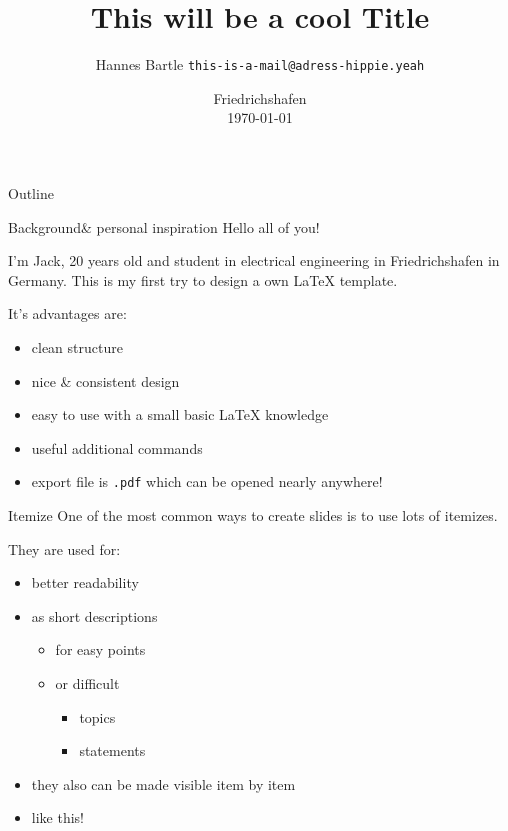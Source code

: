 \documentclass[	12pt, 				
				t,					
				aspectratio=169,
				]{beamer}
\title{This will be a cool Title }
\date{Friedrichshafen\\\today}
\author{Hannes Bartle \texttt{this-is-a-mail@adress-hippie.yeah}}
\institute{DHBW Ravensburg \\ Campus Friedrichshafen}
\begin{document}
	
	\begin{frame}[noframenumbering]
		\titlepage
	\end{frame}


	\begin{frame}{Outline}
		\tableofcontents
	\end{frame}


	
	
	\begin{frame}{Background}{\& personal inspiration}
		Hello all of you! 
		
		I'm Jack, 20 years old and student in electrical engineering in Friedrichshafen in Germany.
		This is my first try to design a own \LaTeX{} template.
		
		It's advantages are:
		\begin{itemize}
			\item clean structure
			\item nice \& consistent design
			\item easy to use with a small basic \LaTeX{} knowledge
			\item useful additional commands
			\item export file is \texttt{.pdf} which can be opened nearly anywhere!
		\end{itemize}
	\end{frame}
	
	
	
	
	
	\begin{frame}{Itemize}{}
		One of the most common ways to create slides is to use lots of itemizes.
		
		They are used for:
		\begin{itemize}
			\item better readability
			\item as short descriptions
			\begin{itemize}
				\item for easy points
				\item or difficult
				\begin{itemize}
					\item topics
					\item statements
				\end{itemize}
			\end{itemize}
			\item <2-> they also can be made visible item by item
			\item <3-> like this!
		\end{itemize}
	\end{frame}
	
\end{document}
